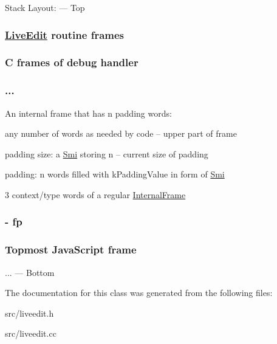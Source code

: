 Stack Layout\+: --- Top \subsubsection*{\hyperlink{classv8_1_1internal_1_1_live_edit}{Live\+Edit} routine frames }

\subsubsection*{C frames of debug handler }

\subsubsection*{... }

An internal frame that has n padding words\+:
\begin{DoxyItemize}
\item any number of words as needed by code -- upper part of frame
\item padding size\+: a \hyperlink{classv8_1_1internal_1_1_smi}{Smi} storing n -- current size of padding
\item padding\+: n words filled with k\+Padding\+Value in form of \hyperlink{classv8_1_1internal_1_1_smi}{Smi}
\item 3 context/type words of a regular \hyperlink{classv8_1_1internal_1_1_internal_frame}{Internal\+Frame} \subsubsection*{-\/ fp }
\end{DoxyItemize}

\subsubsection*{Topmost Java\+Script frame }

... --- Bottom 

The documentation for this class was generated from the following files\+:\begin{DoxyCompactItemize}
\item 
src/liveedit.\+h\item 
src/liveedit.\+cc\end{DoxyCompactItemize}
